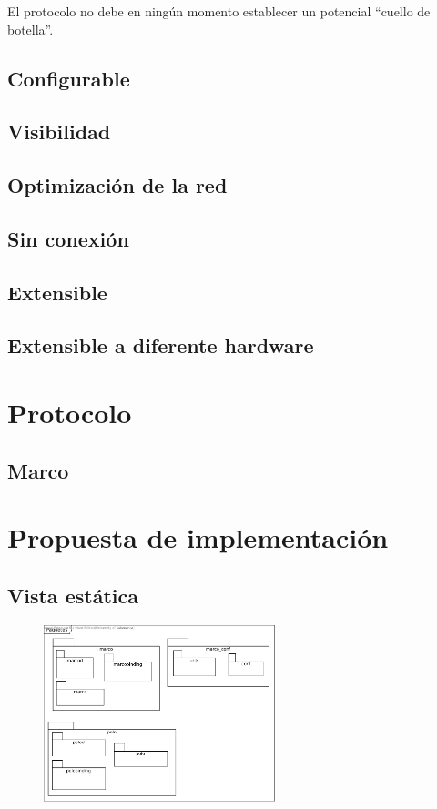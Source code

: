 \documentclass{article}
\begin{document}
El protocolo no debe en ningún momento establecer un potencial ``cuello de botella''.

\subsection{Configurable}

\subsection{Visibilidad}

\subsection{Optimización de la red}

\subsection{Sin conexión}

\subsection{Extensible}

\subsection{Extensible a diferente hardware}

\section{Protocolo}

\subsection{Marco}


\section{Propuesta de implementación}

\subsection{Vista estática}

\begin{figure}[H]
\centering
\includegraphics[width=0.6\textwidth]{Paquetes}
\end{figure}
\end{document}
